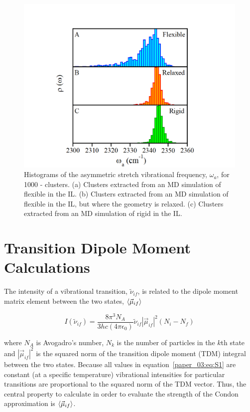 \begin{figure}[h]
  \centering
  \includegraphics{paper_03/figure5.png}
  \caption{Histograms of the  asymmetric stretch vibrational frequency, \(\omega_{a}\), for \num{1000} -\ce{[C4C1im][PF6]} clusters. (a) Clusters extracted from an MD simulation of flexible  in the \ce{[C4C1im][PF6]} IL. (b) Clusters extracted from an MD simulation of flexible  in the \ce{[C4C1im][PF6]} IL, but where the  geometry is relaxed. (c) Clusters extracted from an MD simulation of rigid  in the \ce{[C4C1im][PF6]} IL.}
  \label{paper_03:fig5}
\end{figure}

\section{Transition Dipole Moment Calculations}
\label{paper_03:sec:SI}

The intensity of a vibrational transition, \(\tilde{\nu}_{if}\), is related to the dipole moment matrix element between the two states, \(\Braket{\vec{\mu}_{if}}\)

\begin{equation}
  \label{paper_03:eq:S1}
  I \left( \tilde{\nu}_{if} \right) = \frac{8\pi^{3}N_{A}}{3hc\left( 4\pi\epsilon_{0} \right)} \tilde{\nu}_{if} \left| \vec{\mu}_{if} \right|^{2} (N_{i} - N_{f})
\end{equation}

where \(N_{A}\) is Avogadro's number, \(N_{k}\) is the number of particles in the \(k\)th state and \(\left| \vec{\mu}_{if} \right|^{2}\) is the squared norm of the transition dipole moment (TDM) integral between the two states.\cite{Carbonniere2010} Because all values in equation~\ref{paper_03:eq:S1} are constant (at a specific temperature) vibrational intensities for particular transitions are proportional to the squared norm of the TDM vector. Thus, the central property to calculate in order to evaluate the strength of the Condon approximation is \(\Braket{\vec{\mu}_{if}}\).

